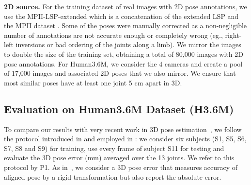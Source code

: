 \documentclass{article}
\begin{document}
{\noindent \bf 2D source.}  For the training dataset of real
images with 2D pose annotations, we use the MPII-LSP-extended
\cite{PishchulinITAAG15} which is a concatenation of the extended LSP
\cite{JohnsonE11} and the MPII dataset \cite{andriluka14cvpr}. Some of
the poses were manually corrected as a non-negligible number of
annotations are not accurate enough or completely wrong (eg., right-left inversions or bad ordering of the joints along a limb). We mirror the images to double the size of the training set,
 obtaining a total of 80,000 images with 2D pose annotations.
For Human3.6M, we consider 
the 4 cameras and  create  a pool of 17,000
images and associated 2D poses that we also mirror. We ensure that
most similar poses have at least one joint 5 cm apart in 3D. 

 
 
 \subsection{Evaluation on Human3.6M Dataset (H3.6M)}

To compare our results with very recent work in 3D pose estimation~\cite{IqbalGG16}, we follow the protocol introduced in \cite{KostrikovG14} and employed in \cite{IqbalGG16}: we consider six subjects (S1, S5, S6, S7, S8 and S9) for training, use every  frame of subject S11 for testing and evaluate the 3D pose error (mm) averaged over the 13 joints. We refer to this protocol by P1. As in~\cite{IqbalGG16}, we consider a 3D pose error that measures accuracy of aligned  pose by a rigid transformation but also report the absolute error.  
\end{document}
